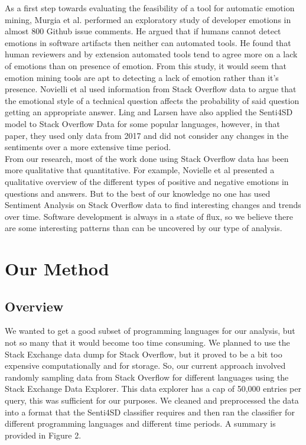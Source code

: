 \documentclass[conference]{IEEEtran}
\begin{document}
As a first step towards evaluating the feasibility of a tool for automatic emotion mining, Murgia et al. \cite{b39} performed an exploratory study of developer emotions in almost 800 Github issue comments. He argued that if humans cannot detect emotions in software artifacts then neither can automated tools. He found that human reviewers and by extension automated tools tend to agree more on a lack of emotions than on presence of emotion. From this study, it would seem that emotion mining tools are apt to detecting a lack of emotion rather than it's presence. Novielli et al\cite{b33} used information from Stack Overflow data to argue that the emotional style of a technical question affects the probability of said question getting an appropriate answer.  Ling and Larsen\cite{b11} have also applied the Senti4SD model to Stack Overflow Data for some popular languages, however, in that paper, they used only data from 2017 and did not consider any changes in the sentiments over a more extensive time period. \\

From our research, most of the work done using Stack Overflow data has been more qualitative that quantitative. For example, Novielle et al \cite{b34} presented a qualitative overview of the different types of positive and negative emotions in questions and answers. But to the best of our knowledge no one has used Sentiment Analysis on Stack Overflow data to find interesting changes and trends over time. Software development is always in a state of flux, so we believe there are some interesting patterns than can be uncovered by our type of analysis.\\

\section{Our Method}
 
\subsection{Overview}
We wanted to get a good subset of programming languages for our analysis, but not so many that it would become too time consuming. We planned to use the Stack Exchange data dump for Stack Overflow, but it proved to be a bit too expensive computationally and for storage. So, our current approach involved randomly sampling data from Stack Overflow for different languages using the Stack Exchange Data Explorer\cite{b28}. This data explorer has a cap of 50,000 entries per query, this was sufficient for our purposes. We cleaned and preprocessed the data into a format that the Senti4SD classifier requires and then ran the classifier for different programming languages and different time periods. A summary is provided in Figure 2.\\
\end{document}
